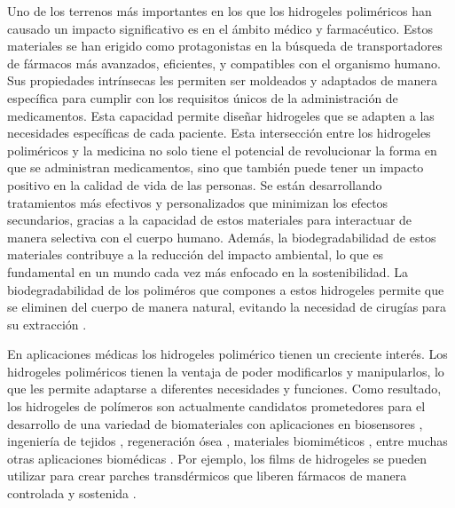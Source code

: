  Uno de los terrenos m\'as importantes en los que los hidrogeles polim\'ericos han causado un impacto significativo es en el \'ambito m\'edico y farmac\'eutico. Estos materiales se han erigido como protagonistas en la b\'usqueda de transportadores de f\'armacos m\'as avanzados, eficientes, y compatibles con el organismo humano. Sus propiedades intr\'insecas les permiten ser moldeados y adaptados de manera espec\'ifica para cumplir con los requisitos \'unicos de la administraci\'on de medicamentos.
Esta capacidad permite dise\~nar hidrogeles  que se adapten a las necesidades espec\'ificas de cada paciente.
Esta intersecci\'on entre los hidrogeles polim\'ericos y la medicina no solo tiene el potencial de revolucionar la forma en que se administran medicamentos, sino que tambi\'en puede tener un impacto positivo en la calidad de vida de las personas. Se est\'an desarrollando tratamientos m\'as efectivos y personalizados que minimizan los efectos secundarios, gracias a la capacidad de estos materiales para interactuar de manera selectiva con el cuerpo humano. Adem\'as, la biodegradabilidad de estos materiales contribuye a la reducci\'on del impacto ambiental, lo que es fundamental en un mundo cada vez m\'as enfocado en la sostenibilidad.
La biodegradabilidad de los polim\'eros que compones a estos hidrogeles permite que se eliminen del cuerpo de manera natural, evitando la necesidad de cirug\'ias para su extracci\'on \cite{samir2022recent}.

En aplicaciones m\'edicas los hidrogeles polim\'erico tienen  un creciente inter\'es. %
Los hidrogeles polim\'ericos tienen la ventaja de poder modificarlos y manipularlos, lo que les permite adaptarse a diferentes necesidades y funciones.
Como resultado, los hidrogeles de pol\'imeros son actualmente candidatos prometedores para el desarrollo de una variedad de biomateriales con aplicaciones en biosensores \cite{zhang2012ultrathin,islam2014responsive}, ingenier\'ia de tejidos \cite{matricardi2013interpenetrating,van2011biopolymer}, regeneraci\'on \'osea \cite{bai2018bioactive}, materiales biomim\'eticos \cite{green2016mimicking,wu2010multifunctional}, entre muchas otras aplicaciones biom\'edicas \cite{Daly2020}.
Por ejemplo, los films de  hidrogeles se pueden utilizar para crear parches transd\'ermicos que liberen f\'armacos de manera controlada y sostenida  \cite{indulekha2016thermoresponsive}.

